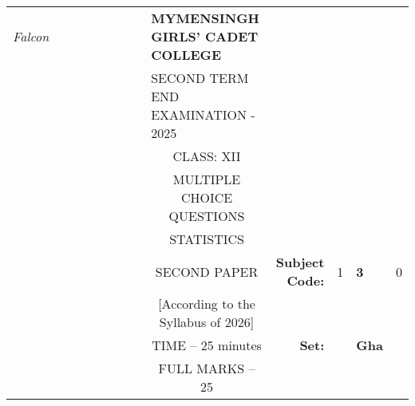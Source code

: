 \documentclass[12pt]{exam}
\begin{document}
\begin{table}[]
\begin{tabular}{llllllllcllll}
\textit{Falcon} &  &  &  &  &  &  &  & \multicolumn{1}{l}{\textbf{MYMENSINGH GIRLS' CADET COLLEGE}} &                                             &                        &                                 &                        \\
                &  &  &  &  &  &  &  & \multicolumn{1}{l}{SECOND TERM END EXAMINATION - 2025}       &                                             &                        & \multicolumn{1}{c}{}            &                        \\
                &  &  &  &  &  &  &  & CLASS: XII                                                   &                                             &                        & \multicolumn{1}{c}{}            &                        \\
                &  &  &  &  &  &  &  & MULTIPLE CHOICE QUESTIONS                                    &                                             &                        & \multicolumn{1}{c}{}            &                        \\
                &  &  &  &  &  &  &  & STATISTICS                                                   &                                             &                        & \multicolumn{1}{r}{}            &                        \\ \cline{11-13} 
                &  &  &  &  &  &  &  & SECOND PAPER                                                 & \multicolumn{1}{r|}{\textbf{Subject Code:}} & \multicolumn{1}{l|}{1} & \multicolumn{1}{l|}{\textbf{3}} & \multicolumn{1}{l|}{0} \\ \cline{11-13} 
                &  &  &  &  &  &  &  & [According to the Syllabus of 2026]                          & \multicolumn{1}{r}{}                        &                        &                                 &                        \\ \cline{12-12}
                &  &  &  &  &  &  &  & TIME – 25 minutes                                            & \multicolumn{1}{r}{\textbf{Set:}}           & \multicolumn{1}{l|}{}  & \multicolumn{1}{l|}{\textbf{Gha}} &                        \\ \cline{12-12}
                &  &  &  &  &  &  &  & FULL MARKS – 25                                              &                                             &                        &                                 &                       
\end{tabular}
\end{table}
\end{document}

